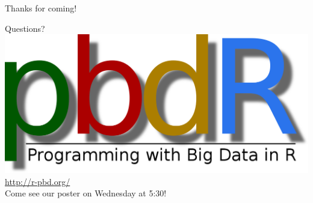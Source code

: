 \begin{frame}[noframenumbering]
 \begin{block}{Thanks for coming!}
 \begin{center}
 \vspace{.4cm}
     {\Huge Questions?}\\[.8cm]
\includegraphics[scale=.1]{../common/pics/logos/newpbdr}
\\[.1cm]
\url{http://r-pbd.org/}
\\[.4cm]
Come see our poster on Wednesday at 5:30!
  \end{center}
 \end{block}
\end{frame}
